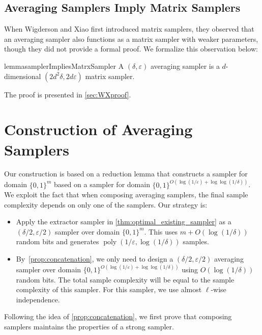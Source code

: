 \documentclass[10pt,a4paper]{article}
\DeclareMathOperator*{\poly}{poly}
\newcommand{\eps}{\varepsilon}
\newcommand{\1}{\mathbbm{1}}
\newcommand{\zo}{\{0, 1\}}
\begin{document}
\subsection{Averaging Samplers Imply Matrix Samplers}
When Wigderson and Xiao first introduced matrix samplers, they observed that an averaging sampler also functions as a matrix sampler with weaker parameters, though they did not provide a formal proof. We formalize this observation below:
\begin{restatable}{lemma}{samplerImpliesMatrxSampler}
\label{lem:sampler_implies_matrix_sampler}
    A $(\delta, \eps)$ averaging sampler is a $d$-dimensional $(2d^2 \delta, 2 d \eps)$ matrix sampler.
\end{restatable}
The proof is presented in \cref{sec:WXproof}.



\section{Construction of Averaging Samplers}
Our construction is based on a reduction lemma that constructs a sampler for domain $\zo^m$ based on a sampler for domain $\zo^{O(\log (1 / \eps) + \log\log(1 / \delta))}$. 
We exploit the fact that when composing averaging samplers, the final sample complexity depends on only one of the samplers. Our strategy is:
\begin{itemize}
    \item Apply the extractor sampler in \cref{thm:optimal_existing_sampler} as a $(\delta / 2, \eps / 2)$ sampler over domain $\zo^m$. This uses $m + O(\log (1 / \delta))$ random bits and generates $\poly(1/\eps, \log (1 / \delta))$ samples.
    \item By~\cref{prop:concatenation}, we only need to design a $(\delta / 2, \eps / 2)$ averaging sampler over domain $\zo^{O(\log (1 / \eps) + \log\log(1 / \delta))}$ using $O(\log(1 / \delta))$ random bits. The total sample complexity will be equal to the sample complexity of this sampler. For this sampler, we use almost $\ell$-wise independence.     
\end{itemize}

Following the idea of \cref{prop:concatenation}, 
we first prove that composing samplers maintains the properties of a strong sampler.
\end{document}
